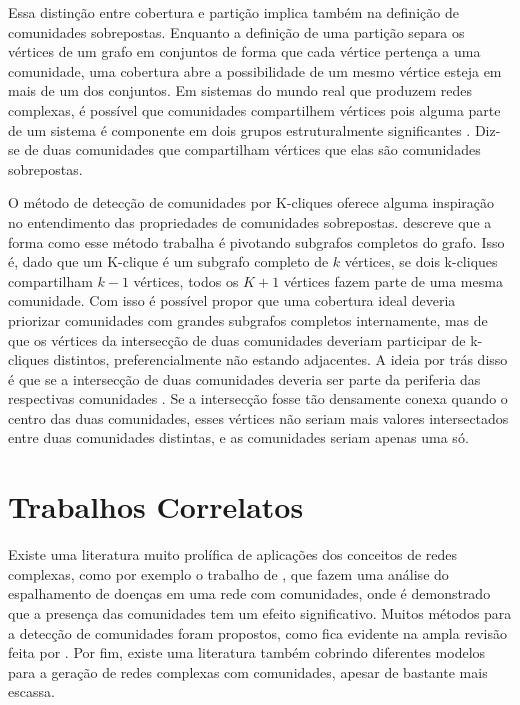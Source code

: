 \documentclass[notes.tex]{subfiles}
\begin{document}
Essa distinção entre cobertura e partição implica também na definição de comunidades sobrepostas.
Enquanto a definição de uma partição separa os vértices de um grafo em conjuntos de forma que cada vértice pertença a uma comunidade, uma cobertura abre a possibilidade de um mesmo vértice esteja em mais de um dos conjuntos.
Em sistemas do mundo real que produzem redes complexas, é possível que comunidades compartilhem vértices pois alguma parte de um sistema é componente em dois grupos estruturalmente significantes \cite{shen2009detect}.
Diz-se de duas comunidades que compartilham vértices que elas são comunidades sobrepostas.

O método de detecção de comunidades por K-cliques oferece alguma inspiração no entendimento das propriedades de comunidades sobrepostas.
 descreve que a forma como esse método trabalha é pivotando subgrafos completos do grafo.
Isso é, dado que um K-clique é um subgrafo completo de $k$ vértices, se dois k-cliques compartilham  $k-1$ vértices, todos os $K+1$ vértices fazem parte de uma mesma comunidade.
Com isso é possível propor que uma cobertura ideal deveria priorizar comunidades com grandes subgrafos completos internamente, mas de que os vértices da intersecção de duas comunidades deveriam participar de k-cliques distintos, preferencialmente não estando adjacentes.
A ideia por trás disso é que se a intersecção de duas comunidades deveria ser parte da periferia das respectivas comunidades \cite{fortunato2010community}.
Se a intersecção fosse tão densamente conexa quando o centro das duas comunidades, esses vértices não seriam mais valores intersectados entre duas comunidades distintas, e as comunidades seriam apenas uma só.

\section{Trabalhos Correlatos\label{sec:estado_arte}}

Existe uma literatura muito prolífica de aplicações dos conceitos de redes complexas, como por exemplo o trabalho de , que fazem uma análise do espalhamento de doenças em uma rede com comunidades, onde é demonstrado que a presença das comunidades tem um efeito significativo.
Muitos métodos para a detecção de comunidades foram propostos, como fica evidente na ampla revisão feita por .
Por fim, existe uma literatura também cobrindo diferentes modelos para a geração de redes complexas com comunidades, apesar de bastante mais escassa.
\end{document}
